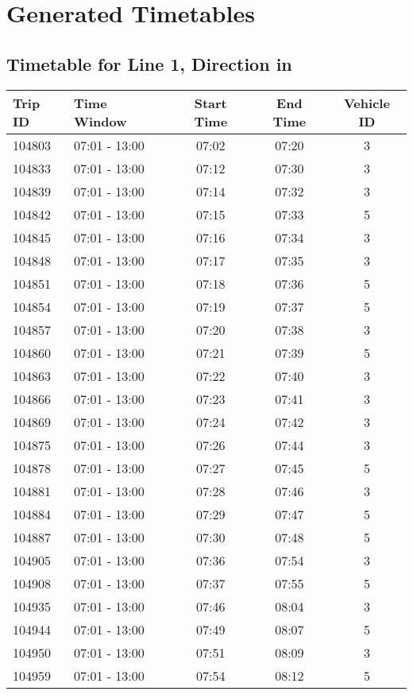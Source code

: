 \documentclass{article}
\begin{document}
            \section*{Generated Timetables}
            \subsection*{Timetable for Line 1, Direction in}
\begin{tabular}{llccc}
\toprule
Trip ID & Time Window & Start Time & End Time & Vehicle ID \\
\midrule
104803 & 07:01 - 13:00 & 07:02 & 07:20 & 3 \\
104833 & 07:01 - 13:00 & 07:12 & 07:30 & 3 \\
104839 & 07:01 - 13:00 & 07:14 & 07:32 & 3 \\
104842 & 07:01 - 13:00 & 07:15 & 07:33 & 5 \\
104845 & 07:01 - 13:00 & 07:16 & 07:34 & 3 \\
104848 & 07:01 - 13:00 & 07:17 & 07:35 & 3 \\
104851 & 07:01 - 13:00 & 07:18 & 07:36 & 5 \\
104854 & 07:01 - 13:00 & 07:19 & 07:37 & 5 \\
104857 & 07:01 - 13:00 & 07:20 & 07:38 & 3 \\
104860 & 07:01 - 13:00 & 07:21 & 07:39 & 5 \\
104863 & 07:01 - 13:00 & 07:22 & 07:40 & 3 \\
104866 & 07:01 - 13:00 & 07:23 & 07:41 & 3 \\
104869 & 07:01 - 13:00 & 07:24 & 07:42 & 3 \\
104875 & 07:01 - 13:00 & 07:26 & 07:44 & 3 \\
104878 & 07:01 - 13:00 & 07:27 & 07:45 & 5 \\
104881 & 07:01 - 13:00 & 07:28 & 07:46 & 3 \\
104884 & 07:01 - 13:00 & 07:29 & 07:47 & 5 \\
104887 & 07:01 - 13:00 & 07:30 & 07:48 & 5 \\
104905 & 07:01 - 13:00 & 07:36 & 07:54 & 3 \\
104908 & 07:01 - 13:00 & 07:37 & 07:55 & 5 \\
104935 & 07:01 - 13:00 & 07:46 & 08:04 & 3 \\
104944 & 07:01 - 13:00 & 07:49 & 08:07 & 5 \\
104950 & 07:01 - 13:00 & 07:51 & 08:09 & 3 \\
104959 & 07:01 - 13:00 & 07:54 & 08:12 & 5 \\

\end{tabular}
\end{document}
